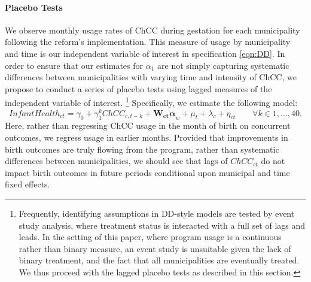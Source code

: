 \documentclass[12pt]{article}
\begin{document}
\begin{spacing}{1.4}
\paragraph{Placebo Tests}
We observe monthly usage rates of ChCC during gestation for each
municipality following the reform's implementation.  This measure
of usage by municipality and time is our independent variable of
interest in specification \ref{eqn:DD}.  In order to ensure that
our estimates for $\alpha_1$ are not simply capturing systematic
differences between municipalities with varying time and intensity
of ChCC, we propose to conduct a series of placebo tests using
lagged measures of the independent variable of interest.%
\footnote{Frequently, identifying assumptions in DD-style models
  are tested by event study analysis, where treatment status is
  interacted with a full set of lags and leads.  In the setting of
  this paper, where program usage is a continuous rather than
  binary measure, an event study is unsuitable given the lack of
  binary treatment, and the fact that all municipalities are
  eventually treated.  We thus proceed with the lagged placebo
  tests as described in this section.}
Specifically, we estimate the following model:
\begin{equation}
  \label{eqn:placebo}
  Infant Health_{ct} = \gamma_0 + \gamma_1^k ChCC_{c,t-k} + \bm{W_{ct}\alpha}_{w} + \mu_t + \lambda_c + \eta_{ct} \qquad \forall k \in {1,\ldots,40}.
\end{equation}
Here, rather than regressing ChCC usage in the month of birth on
concurrent outcomes, we regress usage in earlier months.  Provided
that improvements in birth outcomes are truly flowing from the
program, rather than systematic differences between municipalities,
we should see that lags of $ChCC_{ct}$ do not impact birth outcomes
in future periods conditional upon municipal and time fixed effects.



\end{spacing}
\end{document}
